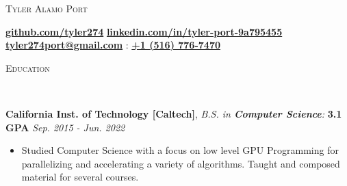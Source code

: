 \documentclass[9pt]{article}
\newenvironment{changemargin}[2]{%
  \begin{list}{}{%
    \setlength{\topsep}{0pt}%
    \setlength{\leftmargin}{#1}%
    \setlength{\rightmargin}{#2}%
    \setlength{\listparindent}{\parindent}%
    \setlength{\itemindent}{\parindent}%
    \setlength{\parsep}{\parskip}%
  }%
  \item[]}{\end{list}
}
\newcommand{\lineover}{
	\begin{changemargin}{-0.05in}{-0.05in}
		\vspace*{-8pt}
		\hrulefill \\
		\vspace*{-2pt}
	\end{changemargin}
}
\newcommand{\header}[1]{
	\begin{changemargin}{-0.5in}{-0.5in}
		\scshape{#1}\\
  	\lineover
	\end{changemargin}
}
\newenvironment{body} {
	\vspace*{-16pt}
	\begin{changemargin}{-0.25in}{-0.5in}
  }	
	{\end{changemargin}
}
\begin{document}
\begin{center}
	{\Large \scshape Tyler Alamo Port}
\end{center}
\vspace*{-2pt}
\hspace{7.25mm} \faGithub \hspace{0.25mm} \textbf{\href{https://github.com/tyler274}{github.com/tyler274}} \hspace{7.25mm} \faLinkedinSquare \hspace{0.25mm} \textbf{\href{https://linkedin.com/in/tyler-port-9a795455/}{linkedin.com/in/tyler-port-9a795455}} \\
\vspace*{3pt}  \hspace{12.25mm} \faEnvelope \hspace{0.1mm} \textbf{\href{mailto:tyler274port@gmail.com}{tyler274port@gmail.com}} \hspace{8.25mm} \faMobile : \textbf{\href{tel:15167767470}{+1 (516) 776-7470}}\\
\vspace{1pt}
\smallskip

\header{Education}
\begin{body}
	\vspace{16pt}
	\textbf{California Inst. of Technology [Caltech]}{}, \emph{B.S. in
	\textbf{Computer Science}:} \textbf{3.1 GPA} \hfill \emph{Sep. 2015 - Jun. 2022}{} \\
	\vspace{-3pt}
	\begin{itemize} \itemsep -0pt
		\item Studied Computer Science with a focus on low level GPU Programming for
		parallelizing and accelerating a variety of algorithms. Taught and composed material for
		several courses.
	\end{itemize}
\end{body}

\smallskip
\vspace*{-3pt}
\end{document}
